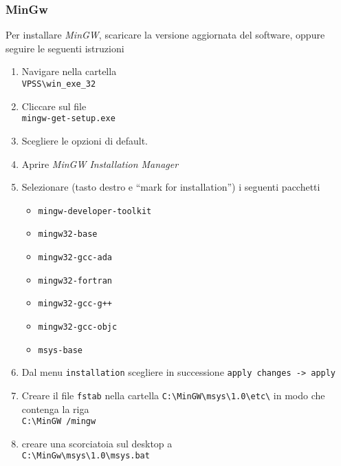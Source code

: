 \documentclass[a4paper,twoside,10pt,openany]{scrbook}
\begin{document}
\subsubsection{MinGw}\label{sec:installazione_mingw}
Per installare \emph{MinGW}, 
scaricare la versione aggiornata del software, 
oppure seguire le seguenti istruzioni
\begin{enumerate}
 \item Navigare nella cartella \\
       \texttt{VPSS\textbackslash win\_exe\_32}
 \item Cliccare sul file\\
       \texttt{mingw-get-setup.exe}
 \item Scegliere le opzioni di default.
 \item Aprire \emph{MinGW Installation Manager}
 \item Selezionare (tasto destro e ``mark for installation'') i seguenti pacchetti
  \begin{itemize}
   \item \texttt{mingw-developer-toolkit}
   \item \texttt{mingw32-base}
   \item \texttt{mingw32-gcc-ada}
   \item \texttt{mingw32-fortran}
   \item \texttt{mingw32-gcc-g++}
   \item \texttt{mingw32-gcc-objc}
   \item \texttt{msys-base}
  \end{itemize}
 \item Dal menu \texttt{installation} scegliere in successione 
       \texttt{apply changes -> apply}
 \item Creare il file \texttt{fstab} nella cartella \texttt{C:\textbackslash MinGW\textbackslash msys\textbackslash 1.0\textbackslash etc\textbackslash} in modo che contenga la riga \\
       \texttt{C:\textbackslash MinGW  /mingw}
 \item creare una scorciatoia sul desktop a\\
       \texttt{C:\textbackslash MinGw\textbackslash msys\textbackslash 1.0\textbackslash msys.bat}
\end{enumerate}
%
\end{document}
